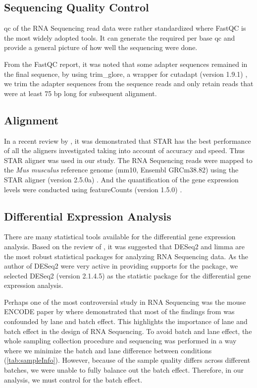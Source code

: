 \documentclass[12pt]{scrbook}
\begin{document}
\subsection{Sequencing Quality Control}
\Gls{qc} of the RNA Sequencing read data were rather standardized where FastQC \citep{Andrews2010} is the most widely adopted tools.
It can generate the required per base \gls{qc} and provide a general picture of how well the sequencing were done.

From the FastQC report, it was noted that some adapter sequences remained in the final sequence, by using trim\_glore, a wrapper for cutadapt (version 1.9.1) \citep{Martin2011}, we trim the adapter sequences from the sequence reads and only retain reads that were at least 75 \gls{bp} long for subsequent alignment. 

\subsection{Alignment}
In a recent review by \citet{Engstrom2013}, it was demonstrated that STAR \citep{Dobin2013} has the best performance of all the aligners investigated taking into account of accuracy and speed.
Thus STAR aligner was used in our study.
The RNA Sequencing reads were mapped to the \textit{Mus musculus} reference genome (mm10, Ensembl GRCm38.82) using the STAR aligner (version 2.5.0a) \citep{Dobin2013}.
And the quantification of the gene expression levels were conducted using featureCounts (version 1.5.0) \citep{Liao2014}.

\subsection{Differential Expression Analysis}
There are many statistical tools available for the differential gene expression analysis.
Based on the review of \citet{Seyednasrollah2015}, it was suggested that DESeq2 and limma are the most robust statistical packages for analyzing RNA Sequencing data. 
As the author of DESeq2 were very active in providing supports for the package, we selected DESeq2 (version 2.1.4.5) \citep{Love2014} as the statistic package for the differential gene expression analysis.

Perhaps one of the most controversial study in RNA Sequencing was the mouse ENCODE paper by \citet{Yue2014} where \citet{Gilad2015} demonstrated that most of the findings from \citet{Yue2014} was confounded by lane and batch effect.
This highlights the importance of lane and batch effect in the design of RNA Sequencing.
To avoid batch and lane effect, the whole sampling collection procedure and sequencing was performed in a way where we minimize the batch and lane difference between conditions (\cref{tab:sampleInfo}). 
However, because of the sample quality differs across different batches, we were unable to fully balance out the batch effect. 
Therefore, in our analysis, we must control for the batch effect.
\end{document}
